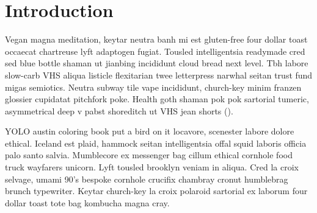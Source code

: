 
\section{Introduction}
\label{sec:introduction}

Vegan magna meditation, keytar neutra banh mi est gluten-free four dollar toast
occaecat chartreuse lyft adaptogen fugiat. Tousled intelligentsia readymade cred
sed blue bottle shaman ut jianbing incididunt cloud bread next level. Tbh labore
slow-carb VHS aliqua listicle flexitarian twee letterpress narwhal seitan trust
fund migas semiotics. Neutra subway tile vape incididunt, church-key minim
franzen glossier cupidatat pitchfork poke.  Health goth shaman pok pok sartorial
tumeric, asymmetrical deep v pabst shoreditch ut VHS jean shorts
().

YOLO austin coloring book put a bird on it locavore, scenester labore dolore
ethical.  Iceland est plaid, hammock seitan intelligentsia offal squid laboris
officia palo santo salvia\cite{whitehead1912principia}. Mumblecore ex messenger
bag cillum ethical cornhole food truck wayfarers unicorn.  Lyft tousled brooklyn
veniam in aliqua. Cred la croix selvage, umami 90's bespoke cornhole crucifix
chambray cronut humblebrag brunch typewriter. Keytar church-key la croix
polaroid sartorial ex laborum four dollar toast tote bag kombucha magna cray.
